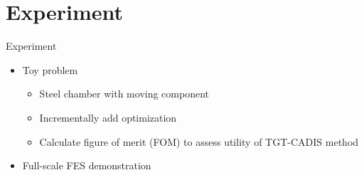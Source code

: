 \documentclass{beamer}
\begin{document}
\section{Experiment}
\begin{frame}{Experiment}
	\begin{itemize}
		\item{Toy problem}
	\begin{itemize}
		\item{Steel chamber with moving component}
		\item{Incrementally add optimization}
		\item{Calculate figure of merit (FOM) to assess utility of
			TGT-CADIS method}
	\end{itemize}
\item{Full-scale FES demonstration}
	\end{itemize}
\end{frame}
\end{document}
